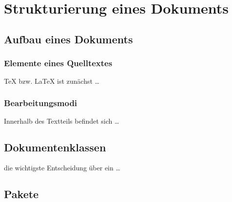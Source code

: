 \documentclass{book}
\begin{document}
\chapter{Strukturierung eines Dokuments}
\section{Aufbau eines Dokuments}
\subsection{Elemente eines Quelltextes}
\TeX{} bzw. \LaTeX{} ist zunächst …
\subsection{Bearbeitungsmodi}
Innerhalb des Textteils befindet sich …
\section{Dokumentenklassen}
die wichtigste Entscheidung über ein …
\section{Pakete}
\end{document}
